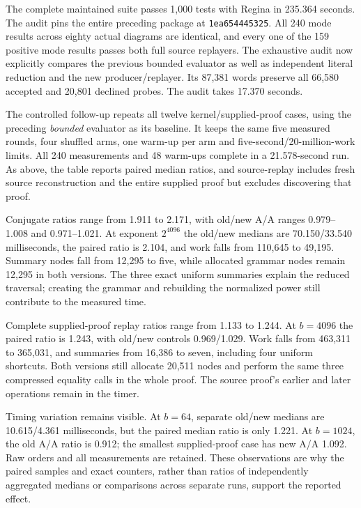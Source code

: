 The complete maintained suite passes 1,000 tests with Regina in 235.364
seconds. The audit pins the entire preceding package at
\texttt{1ea654445325}. All 240 mode results across eighty actual diagrams
are identical, and every one of the 159 positive mode results passes both
full source replayers. The exhaustive audit now explicitly compares the
previous bounded evaluator as well as independent literal reduction and
the new producer/replayer. Its 87,381 words preserve all 66,580 accepted
and 20,801 declined probes. The audit takes 17.370 seconds.



The controlled follow-up repeats all twelve kernel/supplied-proof cases,
using the preceding \emph{bounded} evaluator as its baseline. It keeps the
same five measured rounds, four shuffled arms, one warm-up per arm and
five-second/20-million-work limits. All 240 measurements and 48 warm-ups
complete in a 21.578-second run. As above, the table reports paired median
ratios, and source-replay includes fresh source reconstruction and the
entire supplied proof but excludes discovering that proof.

Conjugate ratios range from 1.911 to 2.171, with old/new A/A ranges
0.979--1.008 and 0.971--1.021. At exponent $2^{4096}$ the old/new medians
are 70.150/33.540 milliseconds, the paired ratio is 2.104, and work falls
from 110,645 to 49,195. Summary nodes fall from 12,295 to five, while
allocated grammar nodes remain 12,295 in both versions. The three exact
uniform summaries explain the reduced traversal; creating the grammar
and rebuilding the normalized power still contribute to the measured time.

Complete supplied-proof replay ratios range from 1.133 to 1.244. At
$b=4096$ the paired ratio is 1.243, with old/new controls 0.969/1.029.
Work falls from 463,311 to 365,031, and summaries from 16,386 to seven,
including four uniform shortcuts. Both versions still allocate 20,511
nodes and perform the same three compressed equality calls in the whole
proof. The source proof's earlier and later operations remain in the timer.

Timing variation remains visible. At $b=64$, separate old/new medians are
10.615/4.361 milliseconds, but the paired median ratio is only 1.221.
At $b=1024$, the old A/A ratio is 0.912; the smallest supplied-proof case
has new A/A 1.092. Raw orders and all measurements are retained. These
observations are why the paired samples and exact counters, rather than
ratios of independently aggregated medians or comparisons across separate
runs, support the reported effect.

